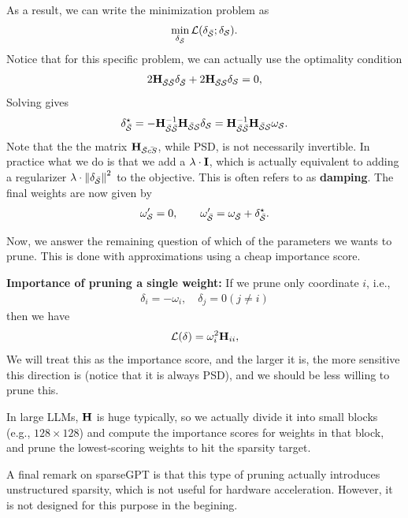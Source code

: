 \documentclass[11pt]{article}  %
\begin{document}
As a result, we can write the minimization problem as 
\begin{align*}
  \min_{\delta_{\bar {\mathcal{S}}}} \mathcal{L}(\delta_{\bar{\mathcal{S}}}; \delta_{\mathcal{S}}). 
\end{align*}  
Notice that for this specific problem, we can actually use the optimality condition 
\begin{align*}
  2\mathbf{H}_{\bar{\mathcal{S}} \bar{\mathcal{S}}} \delta_{\bar {\mathcal{S}}} + 2\mathbf{H}_{\bar{\mathcal{S}}\mathcal{S}} \delta_{\mathcal{S}} = 0,
\end{align*}
Solving gives 
\begin{align*}
  \delta_{\bar{\mathcal{S}}}^\star = -\mathbf{H}_{\bar{\mathcal{S}}\bar{\mathcal{S}}}^{-1} \mathbf{H}_{\bar{\mathcal{S}}\mathcal{S}}\delta_{\mathcal{S}} = \mathbf{H}_{\bar{\mathcal{S}}\bar{\mathcal{S}}}^{-1} \mathbf{H}_{\bar{\mathcal{S}}\mathcal{S}}\omega_{\mathcal{S}}.
\end{align*}
Note that the the matrix $\mathbf{H}_{\bar{\mathcal{S}}\bar{cS}}$, while PSD, is not necessarily invertible.
In practice what we do is that we add a $\lambda \cdot \mathbf{I}$, which is actually equivalent to adding a regularizer $\lambda \cdot \left\lVert \delta_{\bar{\mathcal{S}}} \right\rVert^2$ to the objective.
This is often refers to as \textbf{damping}.
The final weights are now given by 
\begin{align*}
  \omega^\prime_{\mathcal{S}} = 0, \qquad \omega^\prime_{\bar{\mathcal{S}}} = \omega_{\bar{\mathcal{S}}} + \delta^\star_{\bar{\mathcal{S}}}.
\end{align*}

Now, we answer the remaining question of which of the parameters we wants to prune.
This is done with approximations using a cheap importance score.

\textbf{Importance of pruning a single weight:} If we prune only coordinate $i$, i.e., 
\begin{align*}
  \delta_i = -\omega_i, \quad \delta_j = 0 (j \neq i)
\end{align*}
then we have 
\begin{align*}
  \mathcal{L}(\delta) = \omega_i^2\mathbf{H}_{ii},
\end{align*}
We will treat this as the importance score, and the larger it is, the more sensitive this direction is (notice that it is always PSD), and we should be less willing to prune this.

In large LLMs, $\mathbf{H}$ is huge typically, so we actually divide it into small blocks (e.g., $128 \times 128$) and compute the importance scores for weights in that block, and prune the lowest-scoring weights to hit the sparsity target.

A final remark on sparseGPT is that this type of pruning actually introduces unstructured sparsity, which is not useful for hardware acceleration.
However, it is not designed for this purpose in the begining.
\end{document}
